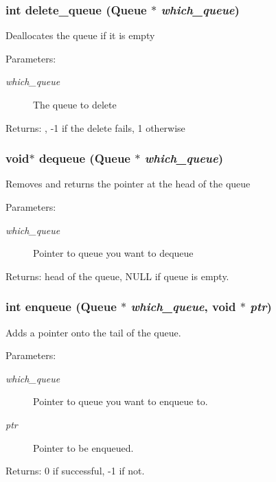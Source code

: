 \subsubsection{\setlength{\rightskip}{0pt plus 5cm}int delete\_\-queue (\bf{Queue} $\ast$ {\em which\_\-queue})}\label{queue_8c_9ae1c24d5e582f72941ff841dcd08f01}


Deallocates the queue if it is empty \begin{Desc}
\item[Parameters:]
\begin{description}
\item[{\em which\_\-queue}]The queue to delete \end{description}
\end{Desc}
\begin{Desc}
\item[Returns:], -1 if the delete fails, 1 otherwise \end{Desc}
\subsubsection{\setlength{\rightskip}{0pt plus 5cm}void$\ast$ dequeue (\bf{Queue} $\ast$ {\em which\_\-queue})}\label{queue_8c_a150371d99ffab3f34b09efa4669a47b}


Removes and returns the pointer at the head of the queue \begin{Desc}
\item[Parameters:]
\begin{description}
\item[{\em which\_\-queue}]Pointer to queue you want to dequeue \end{description}
\end{Desc}
\begin{Desc}
\item[Returns:]head of the queue, NULL if queue is empty. \end{Desc}
\subsubsection{\setlength{\rightskip}{0pt plus 5cm}int enqueue (\bf{Queue} $\ast$ {\em which\_\-queue}, void $\ast$ {\em ptr})}\label{queue_8c_1d57a1b76a1967de5c006ed78777e65f}


Adds a pointer onto the tail of the queue. \begin{Desc}
\item[Parameters:]
\begin{description}
\item[{\em which\_\-queue}]Pointer to queue you want to enqueue to. \item[{\em ptr}]Pointer to be enqueued. \end{description}
\end{Desc}
\begin{Desc}
\item[Returns:]0 if successful, -1 if not. \end{Desc}
